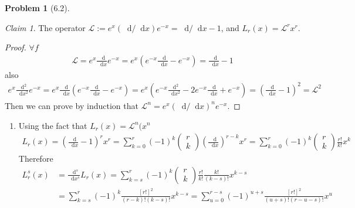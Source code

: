 \documentclass[twoside,11pt]{article}
\newcommand{\CL}{\mathcal{L}}
\renewcommand*\d{\mathop{}\!\mathrm{d}}
\theoremstyle{definition}
\newtheorem{problem}{Problem}
\theoremstyle{remark}
\newtheorem*{claim}{Claim}
\begin{document}
\begin{problem}[6.2]
    \begin{claim}
        The operator $\mathcal{L} := e^x (\d/\d x) e^{-x}= \d/\d x - 1$, 
        and $L_r(x) = \mathcal{L}^r x^r$.
    \end{claim}
    \begin{proof}
        $\forall f$
        \begin{align*}
            \CL = e^x\frac{\d }{\d x}e^{-x} = e^x\left(
                e^{-x}\frac{\d }{\d x}-e^{-x}\right) = 
            \frac{\d }{\d x} - 1
        \end{align*}
        also 
        \begin{align*}
            e^x\frac{\d^2}{\d x^2}e^{-x} = e^x\frac{\d}{\d x}\left(
                e^{-x}\frac{\d}{\d x} - e^{-x}
            \right)
            = e^x\left(
                e^{-x}\frac{\d^2}{\d x^2} - 2e^{-x}\frac{\d}{\d x} + e^{-x}
            \right)
            = \left(\frac{\d}{\d x} - 1\right)^2 = \CL^2
        \end{align*}
        Then we can prove by induction that $\CL^n = e^x(\d/\d x)^n e^{-x}$.
    \end{proof}
    \begin{enumerate}[label=(\alph*)]
        \item Using the fact that $L_r(x) = \CL^n(x^n$
        \begin{align*}
            L_r(x) = \left(\frac{\d}{\d x} - 1\right)^r x^r = 
            \sum_{k=0}^r (-1)^k\begin{pmatrix}
                r\\k
            \end{pmatrix}\left(\frac{\d}{\d x}\right)^{r-k} x^r
            = \sum_{k=0}^r (-1)^k\begin{pmatrix}
                r\\k
            \end{pmatrix}\frac{r!}{k!}x^k
        \end{align*}
        Therefore
        \begin{align*}
            L^s_r(x)
            &= \frac{\d^s}{\d x^s} L_r(x)
            = \sum_{k=s}^r (-1)^k\begin{pmatrix}
                r\\k
            \end{pmatrix} \frac{r!}{k!}\frac{k!}{(k-s)!}x^{k-s}\\
            &= \sum_{k=s}^r (-1)^k \frac{[r!]^2}{(r-k)!(k-s)!}x^{k-s}
            = \sum_{u=0}^{r-s}(-1)^{u+s}\frac{[r!]^2}{(u+s)!(r-u-s)!}x^u
        \end{align*}



\end{enumerate}
\end{problem}
\end{document}
